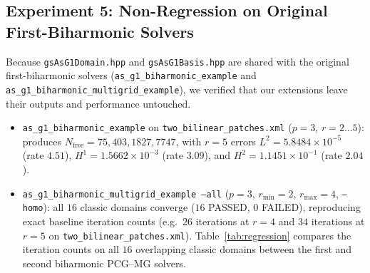 \documentclass[11pt,a4paper]{article}
\begin{document}
\subsection{Experiment 5: Non-Regression on Original First-Biharmonic Solvers}
Because \texttt{gsAsG1Domain.hpp} and \texttt{gsAsG1Basis.hpp} are shared with the original first-biharmonic solvers (\texttt{as\_g1\_biharmonic\_example} and \texttt{as\_g1\_biharmonic\_multigrid\_example}), we verified that our extensions leave their outputs and performance untouched.
\begin{itemize}
    \item \texttt{as\_g1\_biharmonic\_example} on \texttt{two\_bilinear\_patches.xml} ($p=3$, $r=2\dots 5$): produces $N_{\mathrm{free}} = 75, 403, 1827, 7747$, with $r=5$ errors $L^2 = 5.8484\times 10^{-5}$ (rate $4.51$), $H^1 = 1.5662\times 10^{-3}$ (rate $3.09$), and $H^2 = 1.1451\times 10^{-1}$ (rate $2.04$).
    \item \texttt{as\_g1\_biharmonic\_multigrid\_example --all} ($p=3$, $r_{\min}=2$, $r_{\max}=4$, \texttt{--homo}): all $16$ classic domains converge ($16$ PASSED, $0$ FAILED), reproducing exact baseline iteration counts (e.g.\ $26$ iterations at $r=4$ and $34$ iterations at $r=5$ on \texttt{two\_bilinear\_patches.xml}). Table~\ref{tab:regression} compares the iteration counts on all $16$ overlapping classic domains between the first and second biharmonic PCG--MG solvers.
\end{itemize}
\end{document}
